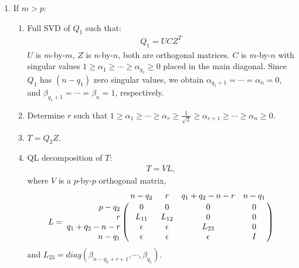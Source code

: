 \begin{enumerate}
        \item If $m > p$:
            \begin{enumerate}
                \item Full SVD of $Q_1$ such that:
                    \begin{align}
                        Q_1 = UCZ^{T}
                    \end{align}
                    $U$ is $m$-by-$m$, $Z$ is $n$-by-$n$, both are orthogonal matrices. $C$ is $m$-by-$n$ with singular values $1 \geq \alpha_1 \geq \cdots \geq \alpha_{q_1} \geq 0$ placed in the main diagonal. Since $Q_1$ has $(n-q_1)$ zero singular values, we obtain $\alpha_{q_1+1} = \cdots = \alpha_{n} = 0$, and $\beta_{q_1+1} = \cdots = \beta_{n} = 1$, respectively. 
                \item Determine $r$ such that $1 \geq \alpha_{1} \geq \cdots \geq \alpha_{r} \geq \frac{1}{\sqrt{2}} \geq \alpha_{r+1} \geq \cdots \geq \alpha_{n} \geq 0$. 
                \item $T = Q_2Z$.
                \item QL decomposition of $T$:
                    \begin{align}
                        T = VL,
                    \end{align}
                    where $V$ is a $p$-by-$p$ orthogonal matrix, 
                    \begin{equation} \label{eq-L-block-case2}
                        L = \bordermatrix{ & n-q_2 & r & q_1+q_2-n-r & n-q_1 \cr
                                    \hfill p-q_2 & 0 & 0 & 0 & 0 \cr
                                    \hfill r & L_{11} & L_{12} & 0 & 0 \cr
                                    \hfill q_1+q_2-n-r & \epsilon & \epsilon & L_{23} & 0 \cr
                                    \hfill n-q_1 & \epsilon & \epsilon & \epsilon & I}
                    \end{equation}
                    and $L_{23} = diag(\beta_{n-q_2+r+1}, \cdots, \beta_{q_1})$.
                

\end{enumerate}
\end{enumerate}
